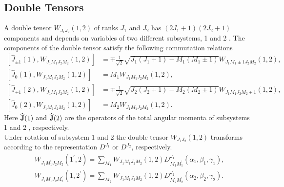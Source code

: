 \subsection{Double Tensors}\label{sec:3.1.5}
A double tensor $W_{J_{1} J_{2}}(1,2)$ of ranks $J_{1}$ and $J_{2}$ has $\left(2 J_{1}+1\right)\left(2 J_{2}+1\right)$ components and depends on variables of two different subsystems, 1 and 2 . The components of the double tensor satisfy the following commutation relations
\begin{align}
\left[\widehat{J}_{ \pm 1}(1), W_{J_{1} M_{1} J_{2} M_{2}}(1,2)\right]&=\mp \frac{1}{\sqrt{2}} \sqrt{J_{1}\left(J_{1}+1\right)-M_{1}\left(M_{1} \pm 1\right)} W_{J_{1} M_{1} \pm 1 J_{2} M_{2}}(1,2)  ,\label{eq:3:1:14}\\
\left[\widehat{J}_{0}(1), W_{J_{1} M_{1} J_{2} M_{2}}(1,2)\right]&=M_{1} W_{J_{1} M_{1} J_{2} M_{2}}(1,2)  ,\label{eq:3:1:15}\\
\left[\widehat{J}_{ \pm 1}(2), W_{J_{1} M_{1} J_{2} M_{2}}(1,2)\right]&=\mp \frac{1}{\sqrt{2}} \sqrt{J_{2}\left(J_{2}+1\right)-M_{2}\left(M_{2} \pm 1\right)} W_{J_{1} M_{1} J_{2} M_{2} \pm 1}(1,2) , \label{eq:3:1:16}\\
\left[\widehat{J}_{0}(2), W_{J_{1} M_{1} J_{2} M_{2}}(1,2)\right]&=M_{2} W_{J_{1} M_{1} J_{2} M_{2}}(1,2). \label{eq:3:1:17}
\end{align}
Here $\widehat{\mathbf{J}}(1)$ and $\widehat{\mathbf{J}}(2)$ are the operators of the total angular momenta of subsystems 1 and 2 , respectively.\\
Under rotation of subsystem 1 and 2 the double tensor $W_{J_{1} J_{2}}(1,2)$ transforms according to the representation $D^{J_{1}}$ or $D^{J_{2}}$, respectively.
\begin{align}
& W_{J_{1} M_{1}^{\prime} J_{2} M_{2}}\left(1^{\prime}, 2\right)=\sum_{M_{1}} W_{J_{1} M_{1} J_{2} M_{2}}(1,2) D_{M_{1} M_{1}^{\prime}}^{J_{1}}\left(\alpha_{1}, \beta_{1}, \gamma_{1}\right) , \label{eq:3:1:18}\\
& W_{J_{1} M_{1} J_{2} M_{2}^{\prime}}\left(1,2^{\prime}\right)=\sum_{M_{2}} W_{J_{1} M_{1} J_{2} M_{2}}(1,2) D_{M_{2} M_{2}^{\prime}}^{J_{2}}\left(\alpha_{2}, \beta_{2}, \gamma_{2}\right) .\label{eq:3:1:19}
\end{align}
